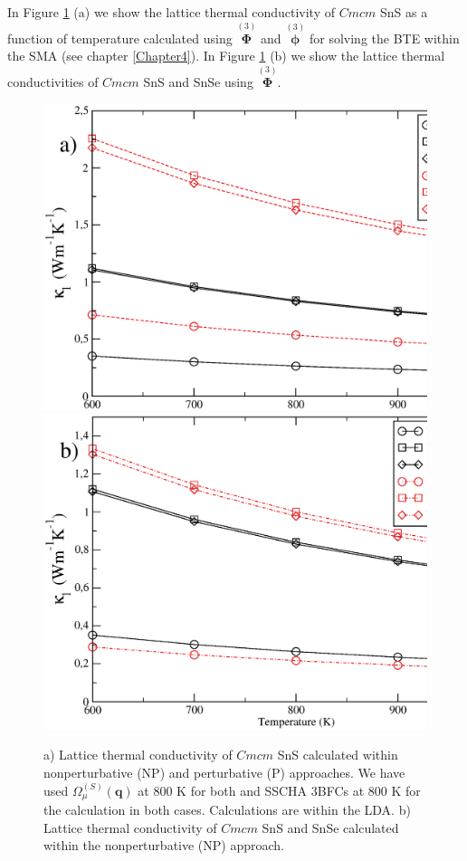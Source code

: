 In Figure \ref{tk-sns} (a) we show the lattice thermal conductivity of $Cmcm$ SnS as a function of temperature calculated using $\overset{(3)}{\boldsymbol{\Phi}}$ and $\overset{(3)}{\boldsymbol{\phi}}$ for solving the BTE within
the SMA (see chapter \ref{Chapter4}). In Figure \ref{tk-sns} (b) we show the lattice thermal conductivities of $Cmcm$ SnS and SnSe using $\overset{(3)}{\boldsymbol{\Phi}}$.
\begin{figure}[ht]
\begin{center}
\includegraphics[width=0.8\linewidth]{Figures/tk-paper1.eps}
\includegraphics[width=0.8\linewidth]{Figures/tk-paper2.eps}
	\caption[Lattice thermal conductivity of SnS and SnSe.]{a) Lattice thermal conductivity of $Cmcm$ SnS calculated within nonperturbative (NP) and perturbative (P) approaches. We have used $\Omega^{(S)}_{\mu}(\mathbf{q})$ at 
$800$ K for both and SSCHA 3BFCs at $800$ K for the calculation in both cases. Calculations are within the LDA. b) 
Lattice thermal conductivity of $Cmcm$ SnS and SnSe calculated within the nonperturbative (NP) approach.}
\label{tk-sns}
\end{center}
\end{figure}
